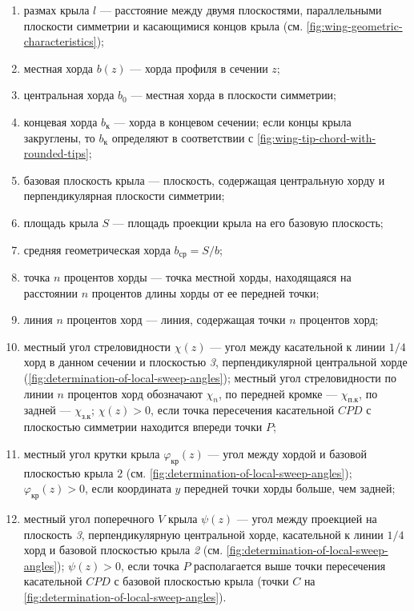 	\begin{enumerate}
		\item размах крыла $l$ --- расстояние между двумя плоскостями, параллельными плоскости симметрии и касающимися концов крыла (см. \cref{fig:wing-geometric-characteristics});
		\item местная хорда $b\left(z\right)$ --- хорда профиля в сечении $z$;
		\item центральная хорда $b_0$ --- местная хорда в плоскости симметрии;
		\item концевая хорда $b_\mathrm{к}$ --- хорда в концевом сечении; если концы крыла закруглены, то $b_\mathrm{к}$ определяют в соответствии с \cref{fig:wing-tip-chord-with-rounded-tips};
		\item базовая плоскость крыла --- плоскость, содержащая центральную хорду и перпендикулярная плоскости симметрии;
		\item площадь крыла $S$ --- площадь проекции крыла на его базовую плоскость;
		\item средняя геометрическая хорда $b_\mathrm{ср} = S/b$;
		\item точка $n$ процентов хорды --- точка местной хорды, находящаяся на расстоянии $n$ процентов длины хорды от ее передней точки;
		\item линия $n$ процентов хорд --- линия, содержащая точки $n$ процентов хорд;
		\item местный угол стреловидности $\chi\left(z\right)$ --- угол между касательной к линии $1/4$ хорд в данном сечении и плоскостью \textit{3}, перпендикулярной центральной хорде (\cref{fig:determination-of-local-sweep-angles}); местный угол стреловидности по линии $n$ процентов хорд обозначают $\chi_n$, по передней кромке --- $\chi_\mathrm{п.к}$, по задней --- $\chi_\mathrm{з.к}$; $\chi\left(z\right) > 0$, если точка пересечения касательной $CPD$ с плоскостью симметрии находится впереди точки $P$;
		\item местный угол крутки крыла $\varphi_\mathrm{кр}\left(z\right)$ --- угол между хордой и базовой плоскостью крыла $2$ (см. \cref{fig:determination-of-local-sweep-angles}); $\varphi_\mathrm{кр}\left(z\right) > 0$, если координата $y$ передней точки хорды больше, чем задней;
		\item местный угол поперечного $V$ крыла $\psi\left(z\right)$ --- угол между проекцией на плоскость \textit{3}, перпендикулярную центральной хорде, касательной к линии $1/4$ хорд и базовой плоскостью крыла \textit{2} (см. \cref{fig:determination-of-local-sweep-angles}); $\psi\left(z\right) > 0$, если точка $P$ располагается выше точки пересечения касательной $CPD$ с базовой плоскостью крыла (точки $C$ на \cref{fig:determination-of-local-sweep-angles}).
	\end{enumerate}
